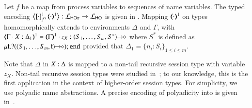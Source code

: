 \documentclass[runningheads]{llncs}
\begin{document}
{\begin{definition}
\label{d:enc:hopitoho}
Let $f$ be a map from process variables to sequences of name variables.
%
The typed encoding 
$\enco{\map{\cdot}^{1}_f, \mapt{\cdot}^{1} %
}: \tyl{L}_{\HOp} \to \tyl{L}_{\HO}$ is given in 
. 
Mapping $(\!\!\langle\cdot\rangle\!\!)^{1}$ on types homomorphically extends to 
environments $\Delta$
and
$\Gamma$, with
$
\tmap{\Gamma \cat \varp{X}:\Delta_1}{1}  =  \tmap{\Gamma}{1} \cat z_X:\shot{(S_1,\ldots,S_m,S^*)}
$
where  
$S^*$ is defined as $\mu\mathsf{t}.? ((S_1,\ldots,S_m,\mathsf{t})\!\! \rightarrow\!\! \diamond) ; \mathtt{end}$
provided that $\Delta_1 = \{n_i:S_i\}_{1\leq i\leq m}$.
\end{definition}



Note that $\Delta$ in $X:\Delta$ is mapped to a non-tail
recursive session type with variable $z_X$. %
Non-tail
recursive session types {were} studied in~\cite{DBLP:journals/corr/abs-1202-2086,TGC14};
{to our knowledge,}
this is the first application in the
context of higher-order session types.
For simplicity,  %
we use polyadic name abstractions.
A precise encoding of polyadicity into \HO is given in~.

}
\end{document}
